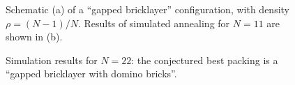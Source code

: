 \begin{figure}[H]

\caption{\label{fig:gb}Schematic (a) of a ``gapped bricklayer'' configuration, with density $\rho = (N-1)/N$. Results of simulated annealing for $N=11$ are shown in (b).}
\end{figure}

\begin{figure}[H]

\caption{\label{fig:n22}Simulation results for $N=22$: the conjectured best packing is a ``gapped bricklayer with domino bricks''.}
\end{figure}


